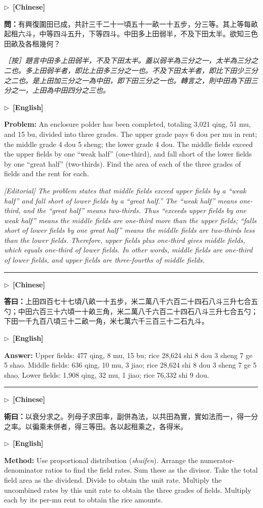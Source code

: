 \documentclass[10pt,a4paper]{article}
\newcommand{\longline}{\par\noindent\rule{\textwidth}{0.4pt}\par}
\newcommand{\CNmarker}{\noindent\textcolor{cnlabel}{$\triangleright$\ \textbf{[Chinese]}}\par}
\newcommand{\ENmarker}{\noindent\textcolor{enlabel}{$\triangleright$\ \textbf{[English]}}\par}
\newcommand{\Question}[1]{\par\noindent\textbf{\color{problemcolor}問：}#1\par}
\newcommand{\Answer}[1]{\par\noindent\textbf{\color{answercolor}答曰：}#1\par}
\newcommand{\Method}[1]{\par\noindent\textbf{\color{methodcolor}術曰：}#1\par}
\newcommand{\EditorialNote}[1]{\par\noindent\textit{［按］#1}\par}
\newcommand{\QuestionEn}[1]{\par\noindent\textbf{\color{problemcolor}Problem:} #1\par}
\newcommand{\AnswerEn}[1]{\par\noindent\textbf{\color{answercolor}Answer:} #1\par}
\newcommand{\MethodEn}[1]{\par\noindent\textbf{\color{methodcolor}Method:} #1\par}
\newcommand{\EditorialNoteEn}[1]{\par\noindent\textit{[Editorial] #1}\par}
\begin{document}
\CNmarker
\Question{有興復圍田已成，共計三千二十一頃五十一畝一十五步，分三等。其上等每畝起租六斗，中等四斗五升，下等四斗。中田多上田弱半，不及下田太半。欲知三色田畝及各租幾何？}

\EditorialNote{題言中田多上田弱半，不及下田太半。蓋以弱半為三分之一，太半為三分之二也。多上田弱半者，即比上田多三分之一也。不及下田太半者，即比下田少三分之二也。是上田加三分之一為中田，即下田三分之一也。轉言之，則中田為下田三分之一，上田為中田四分之三也。}

\ENmarker
\QuestionEn{An enclosure polder has been completed, totaling 3,021 qing, 51 mu, and 15 bu, divided into three grades. The upper grade pays 6 dou per mu in rent; the middle grade 4 dou 5 sheng; the lower grade 4 dou. The middle fields exceed the upper fields by one ``weak half'' (one-third), and fall short of the lower fields by one ``great half'' (two-thirds). Find the area of each of the three grades of fields and the rent for each.}

\EditorialNoteEn{The problem states that middle fields exceed upper fields by a ``weak half'' and fall short of lower fields by a ``great half.'' The ``weak half'' means one-third, and the ``great half'' means two-thirds. Thus ``exceeds upper fields by one weak half'' means the middle fields are one-third more than the upper fields; ``falls short of lower fields by one great half'' means the middle fields are two-thirds less than the lower fields. Therefore, upper fields plus one-third gives middle fields, which equals one-third of lower fields. In other words, middle fields are one-third of lower fields, and upper fields are three-fourths of middle fields.}

\longline

\CNmarker
\Answer{上田四百七十七頃八畝一十五步，米二萬八千六百二十四石八斗三升七合五勺；中田六百三十六頃一十畝三角，米二萬八千六百二十四石八斗三升七合五勺；下田一千九百八頃三十二畝一角，米七萬六千三百三十二石九斗。}

\ENmarker
\AnswerEn{Upper fields: 477 qing, 8 mu, 15 bu; rice 28,624 shi 8 dou 3 sheng 7 ge 5 shao. Middle fields: 636 qing, 10 mu, 3 jiao; rice 28,624 shi 8 dou 3 sheng 7 ge 5 shao. Lower fields: 1,908 qing, 32 mu, 1 jiao; rice 76,332 shi 9 dou.}

\longline

\CNmarker
\Method{以衰分求之。列母子求田率，副併為法，以共田為實，實如法而一，得一分之率。以徧乘未併者，得三等田。各以起租乘之，各得米。}

\ENmarker
\MethodEn{Use proportional distribution (\textit{shuifen}). Arrange the numerator-denominator ratios to find the field rates. Sum these as the divisor. Take the total field area as the dividend. Divide to obtain the unit rate. Multiply the uncombined rates by this unit rate to obtain the three grades of fields. Multiply each by its per-mu rent to obtain the rice amounts.}
\end{document}
